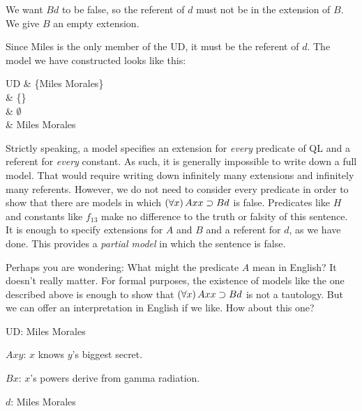 We want $Bd$ to be false, so the referent of $d$ must not be in the extension of $B$. We give $B$ an empty extension.

Since Miles is the only member of the UD, it must be the referent of $d$. The model we have constructed looks like this:
\begin{partialmodel}
	UD			& \{Miles Morales\}\\
	 	& \{\}\\
		& $\emptyset$\\
		& Miles Morales
\end{partialmodel}

Strictly speaking, a model specifies an extension for \emph{every} predicate of QL and a referent for \emph{every} constant. As such, it is generally impossible to write down a full model. That would require writing down infinitely many extensions and infinitely many referents. However, we do not need to consider every predicate in order to show that there are models in which $(\forall x) \,Axx \supset Bd$ is false. Predicates like $H$ and constants like $f_{13}$ make no difference to the truth or falsity of this sentence. It is enough to specify extensions for $A$ and $B$ and a referent for $d$, as we have done. This provides a \emph{partial model} in which the sentence is false.

Perhaps you are wondering: What might the predicate $A$ mean in English? It doesn't really matter. For formal purposes, the existence of models like the one described above is enough to show that $(\forall x) \, Axx \supset Bd$ is not a tautology. But we can offer an interpretation in English if we like. How about this one?

\begin{ekey}
\item[UD:] Miles Morales
\item[$Axy$:] $x$ knows $y$'s biggest secret.
\item[$Bx$:] $x$'s powers derive from gamma radiation.
\item[$d$:] Miles Morales
\end{ekey}

